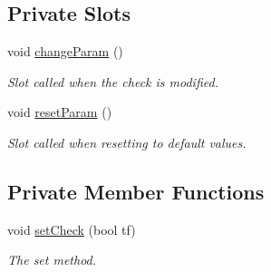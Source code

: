 \subsection*{Private Slots}
\begin{DoxyCompactItemize}
\item 
\mbox{\label{classSGPlotFeatureBox_a48ce4f242b40d6a3cf188373a9274b64}} 
void \hyperlink{classSGPlotFeatureBox_a48ce4f242b40d6a3cf188373a9274b64}{change\+Param} ()
\begin{DoxyCompactList}\small\item\em Slot called when the check is modified. \end{DoxyCompactList}\item 
\mbox{\label{classSGPlotFeatureBox_aca4e8ce580d33046430edfb0c6f3341c}} 
void \hyperlink{classSGPlotFeatureBox_aca4e8ce580d33046430edfb0c6f3341c}{reset\+Param} ()
\begin{DoxyCompactList}\small\item\em Slot called when resetting to default values. \end{DoxyCompactList}\end{DoxyCompactItemize}
\subsection*{Private Member Functions}
\begin{DoxyCompactItemize}
\item 
\mbox{\label{classSGPlotFeatureBox_a8a020173cbf2ff8e4bc6d046e0f62b65}} 
void \hyperlink{classSGPlotFeatureBox_a8a020173cbf2ff8e4bc6d046e0f62b65}{set\+Check} (bool tf)
\begin{DoxyCompactList}\small\item\em The set method. \end{DoxyCompactList}\end{DoxyCompactItemize}
